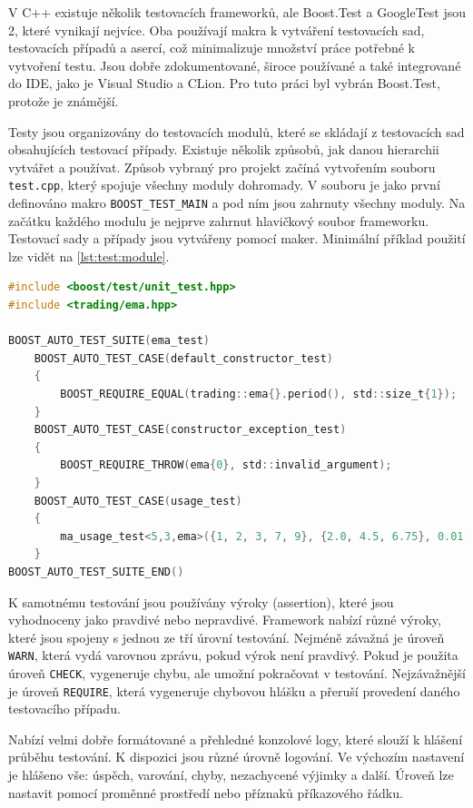 V C++ existuje několik testovacích frameworků, ale Boost.Test a GoogleTest jsou 2, které vynikají nejvíce.
Oba používají makra k vytváření testovacích sad, testovacích případů a asercí, což minimalizuje množství práce potřebné k vytvoření testu.
Jsou dobře zdokumentované, široce používané a také integrované do IDE, jako je Visual Studio a CLion.
Pro tuto práci byl vybrán Boost.Test, protože je známější.

Testy jsou organizovány do testovacích modulů, které se skládají z testovacích sad obsahujících testovací případy.
Existuje několik způsobů, jak danou hierarchii vytvářet a používat.
Způsob vybraný pro projekt začíná vytvořením souboru \texttt{test.cpp}, který spojuje všechny moduly dohromady.
V souboru je jako první definováno makro \texttt{BOOST\_TEST\_MAIN} a pod ním jsou zahrnuty všechny moduly.
Na začátku každého modulu je nejprve zahrnut hlavičkový soubor frameworku.
Testovací sady a případy jsou vytvářeny pomocí maker.
Minimální příklad použití lze vidět na \ref{lst:test:module}.

\begin{lstlisting}[caption={~Ukázka testovacího modulu},label={lst:test:module},captionpos=t,abovecaptionskip=-\medskipamount,belowcaptionskip=\medskipamount,language=C]
#include <boost/test/unit_test.hpp>
#include <trading/ema.hpp>

BOOST_AUTO_TEST_SUITE(ema_test)
    BOOST_AUTO_TEST_CASE(default_constructor_test)
    {
        BOOST_REQUIRE_EQUAL(trading::ema{}.period(), std::size_t{1});
    }
    BOOST_AUTO_TEST_CASE(constructor_exception_test)
    {
        BOOST_REQUIRE_THROW(ema{0}, std::invalid_argument);
    }
    BOOST_AUTO_TEST_CASE(usage_test)
    {
        ma_usage_test<5,3,ema>({1, 2, 3, 7, 9}, {2.0, 4.5, 6.75}, 0.01);
    }
BOOST_AUTO_TEST_SUITE_END()
\end{lstlisting}

K samotnému testování jsou používány výroky (assertion), které jsou vyhodnoceny jako pravdivé nebo nepravdivé.
Framework nabízí různé výroky, které jsou spojeny s jednou ze tří úrovní testování.
Nejméně závažná je úroveň \texttt{WARN}, která vydá varovnou zprávu, pokud výrok není pravdivý.
Pokud je použita úroveň \texttt{CHECK}, vygeneruje chybu, ale umožní pokračovat v testování.
Nejzávažnější je úroveň \texttt{REQUIRE}, která vygeneruje chybovou hlášku a přeruší provedení daného testovacího případu.

Nabízí velmi dobře formátované a přehledné konzolové logy, které slouží k hlášení průběhu testování.
K dispozici jsou různé úrovně logování.
Ve výchozím nastavení je hlášeno vše: úspěch, varování, chyby, nezachycené výjimky a další.
Úroveň lze nastavit pomocí proměnné prostředí nebo příznaků příkazového řádku.

